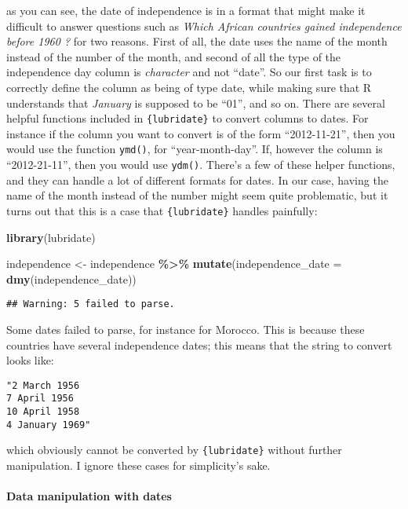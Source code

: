 \documentclass[
]{article}
\newenvironment{Shaded}{\begin{snugshade}}{\end{snugshade}}
\newcommand{\DataTypeTok}[1]{\textcolor[rgb]{0.13,0.29,0.53}{#1}}
\newcommand{\KeywordTok}[1]{\textcolor[rgb]{0.13,0.29,0.53}{\textbf{#1}}}
\newcommand{\NormalTok}[1]{#1}
\newcommand{\OperatorTok}[1]{\textcolor[rgb]{0.81,0.36,0.00}{\textbf{#1}}}
\newcommand{\StringTok}[1]{\textcolor[rgb]{0.31,0.60,0.02}{#1}}
\begin{document}
as you can see, the date of independence is in a format that might make it difficult to answer questions
such as \emph{Which African countries gained independence before 1960 ?} for two reasons. First of all,
the date uses the name of the month instead of the number of the month, and second of all the type of
the independence day column is \emph{character} and not ``date''. So our first task is to correctly define the column
as being of type date, while making sure that R understands that \emph{January} is supposed to be ``01'', and so
on. There are several helpful functions included in \texttt{\{lubridate\}} to convert columns to dates. For instance
if the column you want to convert is of the form ``2012-11-21'', then you would use the function \texttt{ymd()},
for ``year-month-day''. If, however the column is ``2012-21-11'', then you would use \texttt{ydm()}. There's
a few of these helper functions, and they can handle a lot of different formats for dates. In our case,
having the name of the month instead of the number might seem quite problematic, but it turns out
that this is a case that \texttt{\{lubridate\}} handles painfully:

\begin{Shaded}
\begin{Highlighting}[]
\KeywordTok{library}\NormalTok{(lubridate)}

\NormalTok{independence \textless{}{-}}\StringTok{ }\NormalTok{independence }\OperatorTok{\%\textgreater{}\%}
\StringTok{  }\KeywordTok{mutate}\NormalTok{(}\DataTypeTok{independence\_date =} \KeywordTok{dmy}\NormalTok{(independence\_date))}
\end{Highlighting}
\end{Shaded}

\begin{verbatim}
## Warning: 5 failed to parse.
\end{verbatim}

Some dates failed to parse, for instance for Morocco. This is because these countries have several
independence dates; this means that the string to convert looks like:

\begin{verbatim}
"2 March 1956
7 April 1956
10 April 1958
4 January 1969"
\end{verbatim}

which obviously cannot be converted by \texttt{\{lubridate\}} without further manipulation. I ignore these cases for
simplicity's sake.

\hypertarget{data-manipulation-with-dates}{%
\paragraph{Data manipulation with dates}\label{data-manipulation-with-dates}}
\end{document}

